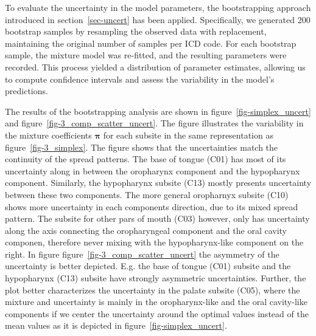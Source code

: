 \documentclass[
  sn-mathphys-num,
]{sn-jnl}
\begin{document}
To evaluate the uncertainty in the model parameters, the bootstrapping
approach introduced in section~\ref{sec-uncert} has been applied.
Specifically, we generated 200 bootstrap samples by resampling the
observed data with replacement, maintaining the original number of
samples per ICD code. For each bootstrap sample, the mixture model was
re-fitted, and the resulting parameters were recorded. This process
yielded a distribution of parameter estimates, allowing us to compute
confidence intervals and assess the variability in the model's
predictions.

The results of the bootstrapping analysis are shown in
figure~\ref{fig-simplex_uncert} and
figure~\ref{fig-3_comp_scatter_uncert}. The figure illustrates the
variability in the mixture coefficients \(\boldsymbol{\pi}\) for each
subsite in the same representation as figure~\ref{fig-3_simplex}. The
figure shows that the uncertainties match the continuity of the spread
patterns. The base of tongue (C01) has most of its uncertainty along in
between the oropharynx component and the hypopharynx component.
Similarly, the hypopharynx subsite (C13) mostly presents uncertainty
between these two components. The more general oropharnyx subsite (C10)
shows more uncertainty in each components direction, due to its mixed
spread pattern. The subsite for other pars of mouth (C03) however, only
has uncertainty along the axis connecting the oropharyngeal component
and the oral cavity componen, therefore never mixing with the
hypopharynx-like component on the right. In figure
figure~\ref{fig-3_comp_scatter_uncert} the asymmetry of the uncertainty
is better depicted. E.g. the base of tongue (C01) subsite and the
hypopharynx (C13) subsite have strongly asymmetric uncertainties.
Further, the plot better characterizes the uncertainty in the palate
subsite (C05), where the mixture and uncertainty is mainly in the
oropharynx-like and the oral cavity-like components if we center the
uncertainty around the optimal values instead of the mean values as it
is depicted in figure~\ref{fig-simplex_uncert}.
\end{document}
